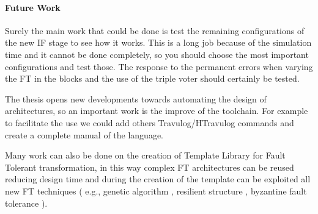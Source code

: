 {	\paragraph{Future Work}{
        Surely the main work that could be done is test the remaining configurations of the new IF stage to see how it works. This is a long job because of the simulation time and it cannot be done completely, so you should choose the most important configurations and test those. The response to the permanent errors when varying the FT in the blocks and the use of the triple voter should certainly be tested.

        The thesis opens new developments towards automating the design of architectures, so an important work is the improve of the toolchain. 
        For example to facilitate the use  we could add others Travulog/HTravulog commands and create a complete manual of the language.
        
        Many work can also be done on the creation of Template Library for Fault Tolerant transformation, in this way complex FT architectures can be reused reducing design time and during the creation of the template can be exploited all new FT techniques  ( e.g., genetic algorithm , resilient structure , byzantine fault tolerance  ).
	}
}